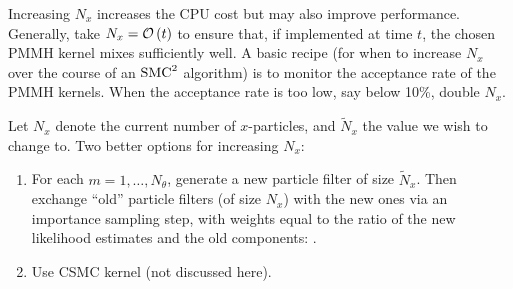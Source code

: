 Increasing $N_x$ increases the CPU cost but may also improve performance. Generally, take $N_x = \mathcal{O}\left(t\right)$ to ensure that, if implemented at time $t$, the chosen PMMH kernel mixes sufficiently well. A basic recipe (for when to increase $N_x$ over the course of an $\text{SMC}^2$ algorithm) is to monitor the acceptance rate of the PMMH kernels. When the acceptance rate is too low, say below 10\%, double $N_x$.

Let $N_x$ denote the current number of $x$-particles, and $\tilde{N}_x$ the value we wish to change to. Two better options for increasing $N_x$:

\begin{enumerate}
  \item  For each $m=1, \dots, N_\theta$, generate a new particle filter of size $\tilde{N}_x$. Then exchange ``old'' particle filters (of size $N_x$) with the new ones via an importance sampling step, with weights equal to the ratio of the new likelihood estimates and the old components:
  \beq
    .
  \eeq
  \item Use CSMC kernel (not discussed here).
\end{enumerate}
